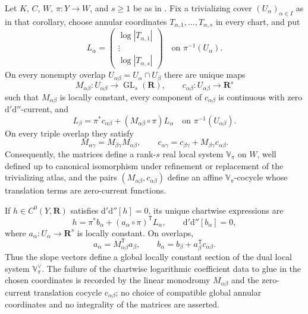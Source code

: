 \begin{proposition}
\label{prop:p062-polyannulus-bundle-slope-local-system}
Let $K$, $C$, $W$, $\pi:Y\to W$, and $s\geq1$ be as in
.  Fix a trivializing
cover $(U_\alpha)_{\alpha\in I}$ as in that corollary, choose annular
coordinates $T_{\alpha,1},\ldots,T_{\alpha,s}$ in every chart, and put
\[
 L_\alpha=
 \begin{pmatrix}
  \log|T_{\alpha,1}|\\[-2pt]
  \vdots\\[-2pt]
  \log|T_{\alpha,s}|
 \end{pmatrix}
 \quad\text{on }\pi^{-1}(U_\alpha).
\]
On every nonempty overlap $U_{\alpha\beta}=U_\alpha\cap U_\beta$ there
are unique maps
\[
 M_{\alpha\beta}:U_{\alpha\beta}\longrightarrow
      \operatorname{GL}_s(\mathbf R),
 \qquad
 c_{\alpha\beta}:U_{\alpha\beta}\longrightarrow\mathbf R^s
\]
such that $M_{\alpha\beta}$ is locally constant, every component of
$c_{\alpha\beta}$ is continuous with zero $\mathrm d'\mathrm d''$-current,
and
\begin{equation}
\label{eq:p062-annular-coordinate-transition}
 L_\beta
 =\pi^*c_{\alpha\beta}+
   (M_{\alpha\beta}\circ\pi)L_\alpha
 \quad\text{on }\pi^{-1}(U_{\alpha\beta}).
\end{equation}
On every triple overlap they satisfy
\begin{equation}
\label{eq:p062-annular-affine-cocycle}
 M_{\alpha\gamma}=M_{\beta\gamma}M_{\alpha\beta},
 \qquad
 c_{\alpha\gamma}
 =c_{\beta\gamma}+M_{\beta\gamma}c_{\alpha\beta}.
\end{equation}
Consequently, the matrices define a rank-$s$ real local system
$\mathbb{V}_\pi$ on $W$, well defined up to canonical isomorphism under
refinement or replacement of the trivializing atlas, and the pairs
$(M_{\alpha\beta},c_{\alpha\beta})$ define an affine
$\mathbb{V}_\pi$-cocycle whose translation terms are zero-current functions.

If $h\in C^0(Y,\mathbf R)$ satisfies
$\mathrm d'\mathrm d''[h]=0$, its unique chartwise expressions are
\begin{equation}
\label{eq:p062-annular-local-normal-form}
 h=\pi^*b_\alpha+
   (a_\alpha\circ\pi)^{\mathsf T}L_\alpha,
 \qquad
 \mathrm d'\mathrm d''[b_\alpha]=0,
\end{equation}
where $a_\alpha:U_\alpha\to\mathbf R^s$ is locally constant.  On overlaps,
\begin{equation}
\label{eq:p062-annular-coefficient-transition}
 a_\alpha=M_{\alpha\beta}^{\mathsf T}a_\beta,
 \qquad
 b_\alpha=b_\beta+a_\beta^{\mathsf T}c_{\alpha\beta}.
\end{equation}
Thus the slope vectors define a global locally constant section of the dual
local system $\mathbb{V}_\pi^\vee$.  The failure of the chartwise logarithmic
coefficient data to glue in the chosen coordinates is recorded by the linear
monodromy $M_{\alpha\beta}$ and the zero-current translation cocycle
$c_{\alpha\beta}$; no choice of compatible global annular coordinates and no
integrality of the matrices are asserted.
\end{proposition}
